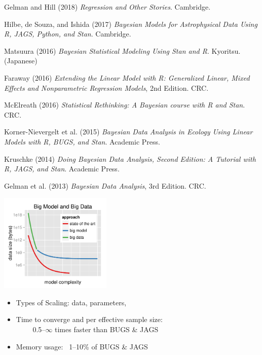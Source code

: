 \documentclass[10pt]{report}
\begin{document}
%
\begin{subitemize}
\footnotesize
\item Gelman and Hill (2018) {\slshape Regression and Other Stories}. Cambridge.
\item Hilbe, de Souza, and Ishida (2017) {\slshape Bayesian Models for Astrophysical Data Using R, JAGS, Python, and Stan}. Cambridge.
\item Matsuura (2016) {\slshape Bayesian Statistical Modeling Using Stan and R}. Kyoritsu. (Japanese)
\item Faraway (2016) {\slshape Extending the Linear Model with R: Generalized Linear, Mixed Effects and Nonparametric Regression Models}, 2nd Edition. CRC.
\item McElreath (2016) {\slshape Statistical Rethinking: A Bayesian course
    with R and Stan}. CRC.
\item Korner-Nievergelt et al. (2015) {\slshape Bayesian Data Analysis in
    Ecology Using Linear Models with R, BUGS, and Stan}. Academic Press.
\item Kruschke (2014) {\slshape Doing Bayesian Data Analysis, Second
    Edition: A Tutorial with R, JAGS, and Stan}. Academic Press.
\item Gelman et al. (2013) {\slshape Bayesian Data Analysis}, 3rd Edition. CRC.
\end{subitemize}


%
\begin{center}
\vspace*{-6pt}
\includegraphics[width=0.4\textwidth]{img/big-model-big-data.pdf}
\vspace*{-6pt}
\end{center}
\begin{itemize}
\item Types of Scaling: data, parameters, 
\item Time to converge and per effective sample size: \\[2pt]
\mbox{ } \ \ \ {0.5--{\large$\infty$} times faster than BUGS \& JAGS}
\item Memory usage: \ {1--10\% of BUGS \& JAGS}
\end{itemize}
\end{document}
